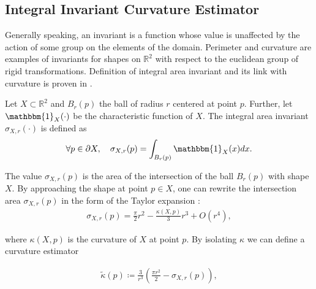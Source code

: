 \documentclass[runningheads]{llncs}
\begin{document}
\subsection{Integral Invariant Curvature Estimator}
Generally speaking, an invariant is a function whose value is unaffected by the action
of some group on the elements of the domain.
Perimeter and curvature are examples of invariants for shapes on
$\mathbb{R}^2$ with respect to the euclidean group of rigid
transformations. Definition of integral area invariant and its link
with curvature is proven in \cite{manay04intinvariant}.


\begin{definition}
  Let $X \subset \mathbb{R}^2$ and $B_r(p)$ the ball of radius $r$ centered at point $p$. Further, let
  $\mathbbm{1}_X(\cdot)$ be the characteristic function of $X$. The integral area invariant $\sigma_{X,r}(\cdot)$ is
  defined as
  \begin{align*}
    \forall p \in \partial X, \quad \sigma_{X,r}(p) = \int_{B_r(p)}{ \mathbbm{1}_X(x) dx}.
  \end{align*}
\end{definition}


The value $\sigma_{X,r}(p)$ is the area of the intersection of the
ball $B_r(p)$ with shape $X$. By approaching the shape at
point $p \in X$, one can rewrite the intersection area
$\sigma_{X,r}(p)$ in the form of the Taylor expansion
\cite{pottman09intinvariant}:
\begin{align*}
  \sigma_{X,r}(p) = \frac{\pi}{2}r^2 - \frac{\kappa(X,p)}{3}r^3 + O(r^4),
\end{align*}
		
where $\kappa(X,p)$ is the curvature of $X$ at point $p$. By isolating $\kappa$ we can define a curvature estimator
	
\begin{align}
  \tilde{\kappa}(p) \coloneqq \frac{3}{r^3}\left( \frac{\pi r^2}{2} - \sigma_{X,r}(p) \right),
  \label{eq:curvature_approximation}
\end{align}
	
\end{document}
